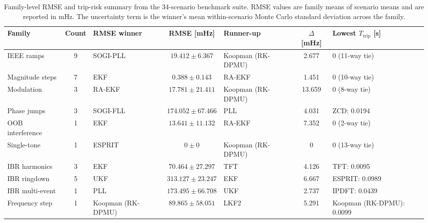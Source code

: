\begin{table}[t]
\centering
\caption{Family-level RMSE and trip-risk summary from the 34-scenario benchmark suite. RMSE values are family means of scenario means and are reported in mHz. The uncertainty term is the winner's mean within-scenario Monte Carlo standard deviation across the family.}
\label{tab:family_summary_extended}
\scriptsize
\setlength{\tabcolsep}{2.8pt}
\renewcommand{\arraystretch}{1.08}
\begin{tabular}{l c l c l c l}
\toprule
Family & Count & RMSE winner & RMSE [mHz] & Runner-up & $\Delta$ [mHz] & Lowest $T_{\mathrm{trip}}$ [s] \\
\midrule
IEEE ramps & 9 & SOGI-PLL & $19.412 \pm 6.367$ & Koopman (RK-DPMU) & 2.677 & 0 (11-way tie) \\
Magnitude steps & 7 & EKF & $0.388 \pm 0.143$ & RA-EKF & 1.451 & 0 (10-way tie) \\
Modulation & 3 & RA-EKF & $17.781 \pm 21.411$ & Koopman (RK-DPMU) & 13.659 & 0 (8-way tie) \\
Phase jumps & 3 & SOGI-FLL & $174.052 \pm 67.466$ & PLL & 4.031 & ZCD: 0.0194 \\
OOB interference & 1 & EKF & $13.641 \pm 11.132$ & RA-EKF & 7.352 & 0 (2-way tie) \\
Single-tone & 1 & ESPRIT & $0 \pm 0$ & Koopman (RK-DPMU) & 0 & 0 (13-way tie) \\
IBR harmonics & 3 & EKF & $70.464 \pm 27.297$ & TFT & 4.126 & TFT: 0.0095 \\
IBR ringdown & 5 & UKF & $313.127 \pm 23.247$ & EKF & 6.667 & ESPRIT: 0.0989 \\
IBR multi-event & 1 & PLL & $173.495 \pm 66.708$ & UKF & 2.737 & IPDFT: 0.0439 \\
Frequency step & 1 & Koopman (RK-DPMU) & $89.865 \pm 58.051$ & LKF2 & 5.291 & Koopman (RK-DPMU): 0.0099 \\
\bottomrule
\end{tabular}
\end{table}
